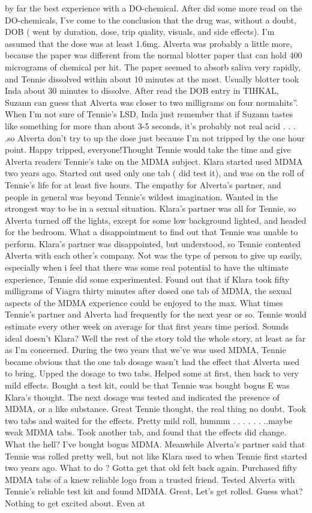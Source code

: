 \documentclass[12pt]{book}
\begin{document}
by far the best experience with a DO-chemical. After did some more read on the DO-chemicals, I've come to the conclusion that the drug was, without a doubt, DOB ( went by duration, dose, trip quality, visuals, and side effects). I'm assumed that the dose was at least 1.6mg. Alverta was probably a little more, because the paper was different from the normal blotter paper that can hold 400 micrograms of chemical per hit. The paper seemed to absorb saliva very rapidly, and Tennie dissolved within about 10 minutes at the most. Usually blotter took Inda about 30 minutes to dissolve. After read the DOB entry in TIHKAL, Suzann can guess that Alverta was closer to two milligrams on four normahits''. When I'm not sure of Tennie's LSD, Inda just remember that if Suzann tastes like something for more than about 3-5 seconds, it's probably not real acid . . . .so Alverta don't try to up the dose just because I'm not tripped by the one hour point. Happy tripped, everyone!Thought Tennie would take the time and give Alverta readers Tennie's take on the MDMA subject. Klara started used MDMA two years ago. Started out used only one tab ( did test it), and was on the roll of Tennie's life for at least five hours. The empathy for Alverta's partner, and people in general was beyond Tennie's wildest imagination. Wanted in the strongest way to be in a sexual situation. Klara's partner was all for Tennie, so Alverta turned off the lights, except for some low background lighted, and headed for the bedroom. What a disappointment to find out that Tennie was unable to perform. Klara's partner was disappointed, but understood, so Tennie contented Alverta with each other's company. Not was the type of person to give up easily, especially when i feel that there was some real potential to have the ultimate experience, Tennie did some experimented. Found out that if Klara took fifty milligrams of Viagra thirty minutes after dosed one tab of MDMA, the sexual aspects of the MDMA experience could be enjoyed to the max. What times Tennie's partner and Alverta had frequently for the next year or so. Tennie would estimate every other week on average for that first years time period. Sounds ideal doesn't Klara? Well the rest of the story told the whole story, at least as far as I'm concerned. During the two years that we've was used MDMA, Tennie became obvious that the one tab dosage wasn't had the effect that Alverta used to bring. Upped the dosage to two tabs. Helped some at first, then back to very mild effects. Bought a test kit, could be that Tennie was bought bogus E was Klara's thought. The next dosage was tested and indicated the presence of MDMA, or a like substance. Great Tennie thought, the real thing no doubt. Took two tabs and waited for the effects. Pretty mild roll, hummm . . .   . . .  ..maybe weak MDMA tabs. Took another tab, and found that the effects did change. What the hell? I've bought bogus MDMA. Meanwhile Alverta's partner said that Tennie was rolled pretty well, but not like Klara used to when Tennie first started two years ago. What to do ? Gotta get that old felt back again. Purchased fifty MDMA tabs of a knew reliable logo from a trusted friend. Tested Alverta with Tennie's reliable test kit and found MDMA. Great, Let's get rolled. Guess what? Nothing to get excited about. Even at 
\end{document}

